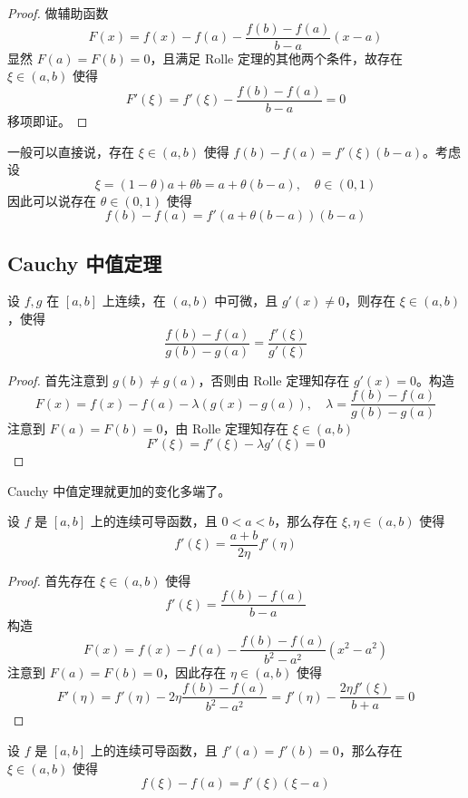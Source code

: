 \begin{proof}
	做辅助函数
	\[ F(x) = f(x) - f(a) - \frac{f(b) - f(a)}{b - a}(x - a) \]
	显然 $F(a) = F(b) = 0$，且满足 Rolle 定理的其他两个条件，故存在 $\xi \in (a, b)$ 使得
	\[ F'(\xi) = f'(\xi) - \frac{f(b) - f(a)}{b - a} = 0 \]
	移项即证。
\end{proof}

一般可以直接说，存在 $\xi \in (a, b)$ 使得 $f(b) - f(a) = f'(\xi)(b-a)$。考虑设
\[ \xi = (1-\theta)a + \theta b = a + \theta(b-a), \quad \theta \in (0, 1) \]
因此可以说存在 $\theta \in (0, 1)$ 使得
\[ f(b) - f(a) = f'(a + \theta(b-a)) (b-a) \]

\subsection{Cauchy 中值定理}

\begin{theorem}
	设 $f,g$ 在 $[a,b]$ 上连续，在 $(a,b)$ 中可微，且 $g'(x)\ne 0$，则存在 $\xi\in (a,b)$，使得
	\[ \frac{f(b)-f(a)}{g(b)-g(a)} = \frac{f'(\xi)}{g'(\xi)} \]
\end{theorem}

\begin{proof}
	首先注意到 $g(b) \neq g(a)$，否则由 Rolle 定理知存在 $g'(x) = 0$。构造
	\[ F(x) = f(x) - f(a) - \lambda (g(x) - g(a)) , \quad \lambda = \frac{f(b) - f(a)}{g(b) - g(a)} \]
	注意到 $F(a) = F(b) = 0$，由 Rolle 定理知存在 $\xi \in (a, b)$
	\[ F'(\xi) = f'(\xi) - \lambda g'(\xi) = 0 \]
\end{proof}

Cauchy 中值定理就更加的变化多端了。

\begin{proposition}
	设 $f$ 是 $[a,b]$ 上的连续可导函数，且 $0 < a < b$，那么存在 $\xi, \eta \in (a,b)$ 使得
	\[ f'(\xi) = \frac{a+b}{2\eta}f'(\eta) \]
\end{proposition}

\begin{proof}
	首先存在 $\xi \in (a,b)$ 使得
	\[ f'(\xi) = \frac{f(b) - f(a)}{b - a} \]
	构造
	\[ F(x) = f(x) - f(a) - \frac{f(b) - f(a)}{b^2 - a^2}(x^2 - a^2) \]
	注意到 $F(a) = F(b) = 0$，因此存在 $\eta \in (a, b)$ 使得
	\[ F'(\eta) = f'(\eta) - 2 \eta \frac{f(b) - f(a)}{b^2 - a^2} = f'(\eta) - \frac{2 \eta f'(\xi)}{b + a} = 0 \]
\end{proof}

\begin{proposition}
	设 $f$ 是 $[a,b]$ 上的连续可导函数，且 $f'(a) = f'(b) = 0$，那么存在 $\xi \in (a,b)$ 使得
	\[ f(\xi) - f(a) = f'(\xi)(\xi - a) \]
\end{proposition}

